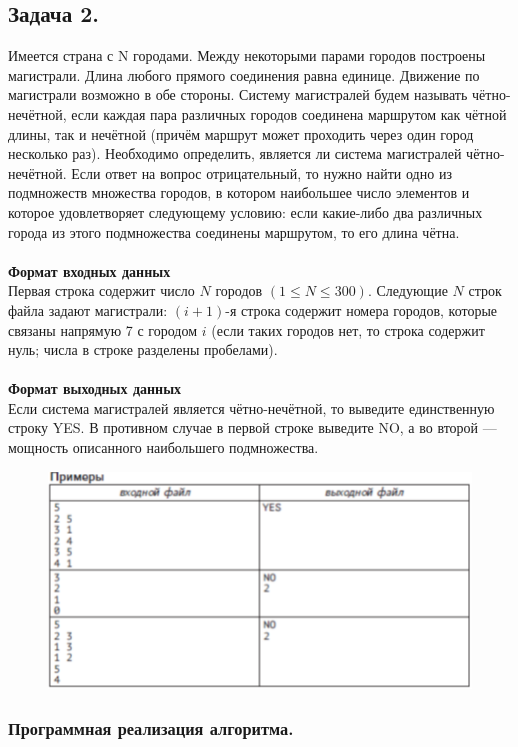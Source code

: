 \documentclass[a4paper, 12pt]{report}
\renewcommand{\leq}{\leqslant}
\begin{document}
	\subsection*{Задача 2.}
	Имеется страна с N городами. Между некоторыми парами городов построены магистрали. Длина любого прямого соединения равна единице. Движение по магистрали возможно в
	обе стороны. Систему магистралей будем называть чётно-нечётной, если каждая пара различных городов соединена маршрутом как чётной длины, так и нечётной (причём маршрут
	может проходить через один город несколько раз). Необходимо определить, является ли система магистралей чётно-нечётной. Если ответ на вопрос отрицательный, то нужно найти одно
	из подмножеств множества городов, в котором наибольшее число элементов и которое удовлетворяет следующему условию: если какие-либо два различных города из этого подмножества
	соединены маршрутом, то его длина чётна.\\\\
	\textbf{Формат входных данных}\\
	Первая строка содержит число $N$ городов $(1 \leq N \leq 300)$. Следующие $N$ строк файла
	задают магистрали: $(i + 1)$-я строка содержит номера городов, которые связаны напрямую
	7
	с городом $i$ (если таких городов нет, то строка содержит нуль; числа в строке разделены
	пробелами).\\\\
	\textbf{Формат выходных данных}\\
	Если система магистралей является чётно-нечётной, то выведите единственную строку
	YES. В противном случае в первой строке выведите NO, а во второй — мощность описанного наибольшего подмножества.
\begin{figure}
	\centering
	\includegraphics[scale=0.5]{screenshot001}
	\caption{}
	\label{fig:screenshot001}
\end{figure}
	
	\subsubsection*{Программная реализация алгоритма.}
\end{document}
